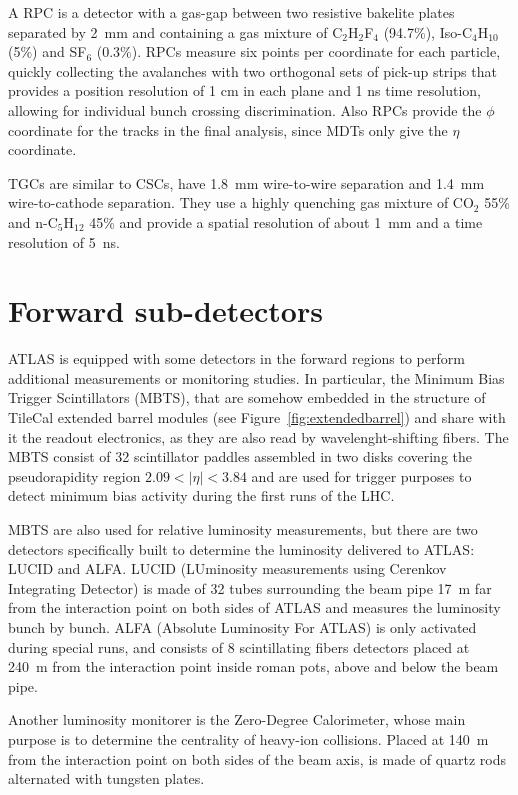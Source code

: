 A RPC is a detector with a gas-gap between two resistive bakelite plates separated by 2~mm and containing
a gas mixture of C$_{2}$H$_{2}$F$_{4}$ (94.7\%), Iso-C$_{4}$H$_{10}$ (5\%) and SF$_{6}$ (0.3\%). 
RPCs measure six points per coordinate for each particle, quickly collecting the avalanches with two 
orthogonal sets of pick-up strips that provides a position resolution of 1 cm in each plane and 1 ns time resolution,
allowing for individual bunch crossing discrimination. Also RPCs provide the $\phi$ coordinate for the tracks in
the final analysis, since MDTs only give the $\eta$ coordinate.

TGCs are similar to CSCs, have 1.8~mm wire-to-wire separation and 
1.4~mm wire-to-cathode separation. They use a highly quenching gas mixture of CO$_{2}$ 55\% and n-C$_{5}$H$_{12}$ 45\%
and provide  a spatial resolution of about 1~mm and a time resolution of 5~ns.

\section{Forward sub-detectors}\label{sec:forward}

ATLAS is equipped with some detectors in the forward regions to perform additional measurements or
monitoring studies. In particular, the Minimum Bias Trigger Scintillators (MBTS), that are somehow
embedded in the structure of TileCal extended barrel modules (see Figure~\ref{fig:extendedbarrel})
and share with it the readout electronics, as they are also read by wavelenght-shifting fibers.
The MBTS consist of 32 scintillator paddles assembled in two disks covering the pseudorapidity region
$2.09<|\eta|<3.84$ and are used for trigger purposes to detect minimum bias activity during the first
runs of the LHC. 

MBTS are also used for relative luminosity measurements, but there are two detectors specifically
built to determine the luminosity delivered to ATLAS: LUCID and ALFA. LUCID (LUminosity measurements
using Cerenkov Integrating Detector) is made of 32 tubes surrounding the beam pipe 17~m
far from the interaction point on both sides of ATLAS and measures the luminosity bunch by bunch.
ALFA (Absolute Luminosity For ATLAS) is only activated during special runs, and consists of 8 
scintillating fibers detectors placed at 240~m from the interaction point inside roman pots, above and
below the beam pipe.

Another luminosity monitorer is the Zero-Degree Calorimeter, whose main purpose is to determine the centrality of heavy-ion
collisions. Placed at 140~m from the interaction point on both sides of the beam axis, is made of quartz rods
alternated with tungsten plates.

